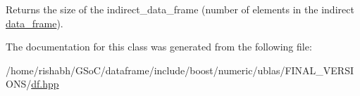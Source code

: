 Returns the size of the indirect\+\_\+data\+\_\+frame (number of elements in the indirect \hyperlink{classboost_1_1numeric_1_1ublas_1_1data__frame}{data\+\_\+frame}). 



The documentation for this class was generated from the following file\+:\begin{DoxyCompactItemize}
\item 
/home/rishabh/\+G\+So\+C/dataframe/include/boost/numeric/ublas/\+F\+I\+N\+A\+L\+\_\+\+V\+E\+R\+S\+I\+O\+N\+S/\hyperlink{df_8hpp}{df.\+hpp}\end{DoxyCompactItemize}
